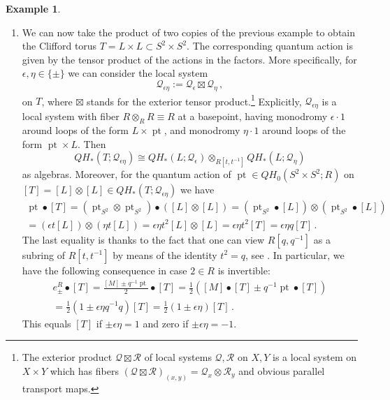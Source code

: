 \documentclass[11pt%
]{article}
\theoremstyle{definition}
\newtheorem{exam}[thm]{Example}
\newcommand{\cQ}{{\mathcal{Q}}}
\newcommand{\cR}{{\mathcal{R}}}
\DeclareMathOperator{\pt}{pt}
\DeclareMathOperator{\0}{\operatorname{\mathbf{0}}}
\begin{document}
\begin{exam}
\begin{enumerate}
        $$\pt\bullet[L]=\pm t[L]\,.$$
        This can be extracted from \cite{Biran_Cornea_Lag_Top_Enumerative_Geom}, but the intuition is very simple: there is only one holomorphic disk in $S^2$ with boundary on $L$ of Maslov index $2$ which also passes through a prescribed point in $M\setminus L$, and the orientations work out so that $\pt\bullet[L]=[L]$ in the untwisted case of $\cQ_+$. For $\cQ_-$ the coefficient is multiplied by the monodromy around $L$, which is $-1$.
    \item We can now take the product of two copies of the previous example to obtain the Clifford torus $T=L\times L\subset S^2\times S^2$. The corresponding quantum action is given by the tensor product of the actions in the factors. More specifically, for $\epsilon,\eta\in\{\pm\}$ we can consider the local system
        $$\cQ_{\epsilon\eta}:=\cQ_\epsilon\boxtimes\cQ_\eta\,,$$
        on $T$, where $\boxtimes$ stands for the exterior tensor product.\footnote{The exterior product $\cQ\boxtimes\cR$ of local systems $\cQ,\cR$ on $X,Y$ is a local system on $X\times Y$ which has fibers $(\cQ\boxtimes\cR)_{(x,y)} = \cQ_x\otimes \cR_y$ and obvious parallel transport maps.} Explicitly, $\cQ_{\epsilon\eta}$ is a local system with fiber $R\otimes_RR\equiv R$ at a basepoint, having monodromy $\epsilon\cdot 1$ around loops of the form $L\times \pt$, and monodromy $\eta\cdot 1$ around loops of the form $\pt\times L$. Then
        $$QH_*(T;\cQ_{\epsilon\eta})\cong QH_*(L;\cQ_\epsilon)\otimes_{R[t,t^{-1}]} QH_*(L;\cQ_\eta)$$
        as algebras. Moreover, for the quantum action of $\pt \in QH_0(S^2\times S^2;R)$ on $[T] = [L]\otimes[L] \in QH_*(T;\cQ_{\epsilon\eta})$ we have
        \begin{multline*}
          \pt\bullet[T]=(\pt_{S^2}\otimes\pt_{S^2})\bullet([L]\otimes[L]) = (\pt_{S^2}\bullet[L])\otimes(\pt_{S^2}\bullet[L])\\
          =(\epsilon t[L])\otimes(\eta t[L]) = \epsilon\eta t^2[L]\otimes[L]=\epsilon\eta t^2[T]=\epsilon\eta q[T]\,.
        \end{multline*}
        The last equality is thanks to the fact that one can view $R[q,q^{-1}]$ as a subring of $R[t,t^{-1}]$ by means of the identity $t^2=q$, see \cite{biran2007quantum}. In particular, we have the following consequence in case $2\in R$ is invertible:
        \begin{multline*}
          e^R_\pm\bullet [T]=\frac{[M]\pm q^{-1}\pt}{2}\bullet [T]=\frac 12([M]\bullet[T] \pm  q^{-1}\pt\bullet [T])\\
           = \frac 12(1\pm \epsilon\eta q^{-1}q)[T] = \frac 12(1\pm \epsilon\eta)[T]\,.
        \end{multline*}
        This equals $[T]$ if $\pm\epsilon\eta=1$ and zero if $\pm\epsilon\eta=-1$.
  \end{enumerate}




\end{exam}
\end{document}
